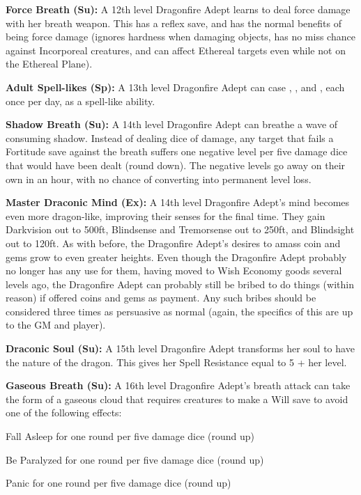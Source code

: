 \textbf{Force Breath (Su):} A 12th level Dragonfire Adept learns to deal force damage with her breath weapon. This has a reflex save, and has the normal benefits of being force damage (ignores hardness when damaging objects, has no miss chance against Incorporeal creatures, and can affect Ethereal targets even while not on the Ethereal Plane).

\textbf{Adult Spell-likes (Sp):} A 13th level Dragonfire Adept can case , , and , each once per day, as a spell-like ability.

\textbf{Shadow Breath (Su):} A 14th level Dragonfire Adept can breathe a wave of consuming shadow. Instead of dealing dice of damage, any target that fails a Fortitude save against the breath suffers one negative level per five damage dice that would have been dealt (round down). The negative levels go away on their own in an hour, with no chance of converting into permanent level loss.

\textbf{Master Draconic Mind (Ex):} A 14th level Dragonfire Adept's mind becomes even more dragon-like, improving their senses for the final time. They gain Darkvision out to 500ft, Blindsense and Tremorsense out to 250ft, and Blindsight out to 120ft. As with before, the Dragonfire Adept's desires to amass coin and gems grow to even greater heights. Even though the Dragonfire Adept probably no longer has any use for them, having moved to Wish Economy goods several levels ago, the Dragonfire Adept can probably still be bribed to do things (within reason) if offered coins and gems as payment. Any such bribes should be considered three times as persuasive as normal (again, the specifics of this are up to the GM and player).

\textbf{Draconic Soul (Su):} A 15th level Dragonfire Adept transforms her soul to have the nature of the dragon. This gives her Spell Resistance equal to 5 + her level.

\textbf{Gaseous Breath (Su):} A 16th level Dragonfire Adept's breath attack can take the form of a gaseous cloud that requires creatures to make a Will save to avoid one of the following effects:

\begin{itemize*}
\item Fall Asleep for one round per five damage dice (round up)
\item Be Paralyzed for one round per five damage dice (round up)
\item Panic for one round per five damage dice (round up)
\end{itemize*}

